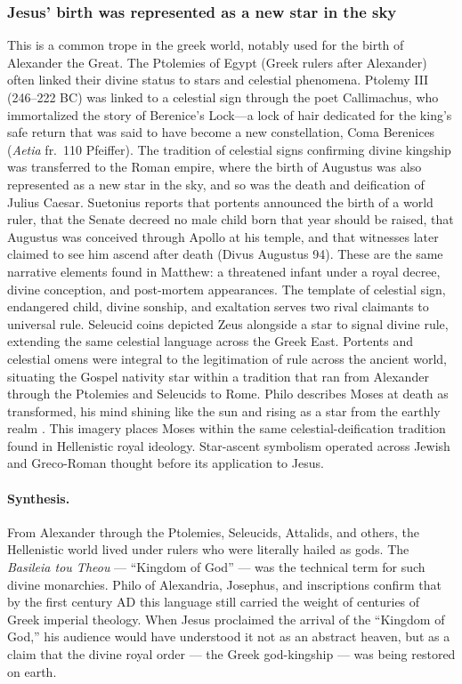 \subsubsection{Jesus' birth was represented as a new star in the sky}\label{subsubsec:jesus-birth-was-represented-as-a-new-star-in-the-sky}
This is a common trope in the greek world, notably used for the birth of Alexander the Great.
The Ptolemies of Egypt (Greek rulers after Alexander) often linked their divine status to stars and celestial phenomena.
Ptolemy III (246--222 BC) was linked to a celestial sign through the poet Callimachus, who immortalized the story of Berenice's Lock---a lock of hair dedicated for the king's safe return that was said to have become a new constellation, Coma Berenices (\emph{Aetia} fr.~110 Pfeiffer).
The tradition of celestial signs confirming divine kingship was transferred to the Roman empire, where the birth of Augustus was also represented as a new star in the sky, and so was the death and deification of Julius Caesar.
Suetonius reports that portents announced the birth of a world ruler, that the Senate decreed no male child born that year should be raised, that Augustus was conceived through Apollo at his temple, and that witnesses later claimed to see him ascend after death (Divus Augustus 94).
These are the same narrative elements found in Matthew: a threatened infant under a royal decree, divine conception, and post-mortem appearances.
The template of celestial sign, endangered child, divine sonship, and exaltation serves two rival claimants to universal rule.
Seleucid coins depicted Zeus alongside a star to signal divine rule, extending the same celestial language across the Greek East.
Portents and celestial omens were integral to the legitimation of rule across the ancient world, situating the Gospel nativity star within a tradition that ran from Alexander through the Ptolemies and Seleucids to Rome.
Philo describes Moses at death as transformed, his mind shining like the sun and rising as a star from the earthly realm \cite{philo:vimoysis}.
This imagery places Moses within the same celestial-deification tradition found in Hellenistic royal ideology.
Star-ascent symbolism operated across Jewish and Greco-Roman thought before its application to Jesus.

\paragraph{Synthesis.}
From Alexander through the Ptolemies, Seleucids, Attalids, and others, the Hellenistic world lived under rulers who were literally hailed as gods.
The \textit{Basileia tou Theou} --- “Kingdom of God” --- was the technical term for such divine monarchies.
Philo of Alexandria, Josephus, and inscriptions confirm that by the first century AD this language still carried the weight of centuries of Greek imperial theology.
When Jesus proclaimed the arrival of the “Kingdom of God,” his audience would have understood it not as an abstract heaven, but as a claim that the divine royal order --- the Greek god-kingship --- was being restored on earth.

